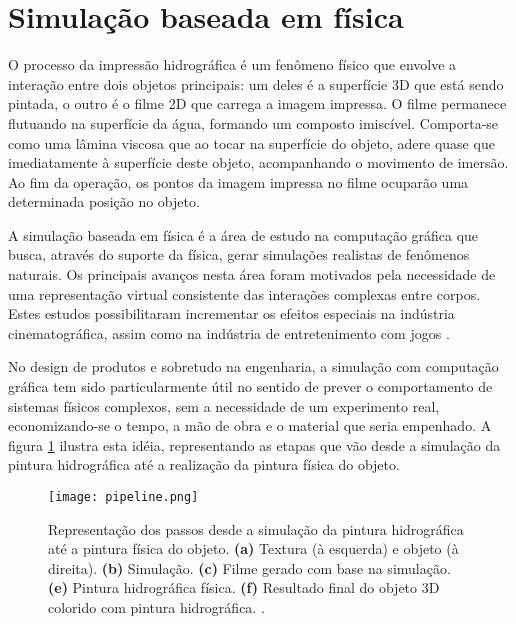 
\acresetall 

\section{Simulação baseada em física}

O processo da impressão hidrográfica é um fenômeno físico que envolve a interação entre dois objetos principais: um deles é a superfície 3D que está sendo pintada, o outro é o filme 2D que carrega a imagem impressa. O filme permanece flutuando na superfície da água, formando um composto imiscível. Comporta-se como uma lâmina viscosa que ao tocar na superfície do objeto, adere quase que imediatamente à superfície deste objeto, acompanhando o movimento de imersão. Ao fim da operação, os pontos da imagem impressa no filme ocuparão uma determinada posição no objeto.

A simulação baseada em física é a área de estudo na computação gráfica que busca, através do suporte da física, gerar simulações realistas de fenômenos naturais. Os principais avanços nesta área foram motivados pela necessidade de uma representação virtual consistente das interações complexas entre corpos. Estes estudos possibilitaram incrementar os efeitos especiais na indústria cinematográfica, assim como na indústria de entretenimento com jogos \cite{reeves1983particle} \cite{millington2007game}.

No design de produtos e sobretudo na engenharia, a simulação com computação gráfica tem sido particularmente útil no sentido de prever o comportamento de sistemas físicos complexos, sem a necessidade de um experimento real, economizando-se o tempo, a mão de obra e o material que seria empenhado. A figura \ref{fig:pipeline1} ilustra esta idéia, representando as etapas que vão desde a simulação da pintura hidrográfica até a realização da pintura física do objeto.

\begin{figure}
\begin{center} 
\texttt{[image: pipeline.png]}
\caption{Representação dos passos desde a simulação da pintura hidrográfica até a pintura física do objeto. \textbf{(a)} Textura (à esquerda) e objeto (à direita). \textbf{(b)} Simulação. \textbf{(c)} Filme gerado com base na simulação. \textbf{(e)} Pintura hidrográfica física. \textbf{(f)} Resultado final do objeto 3D colorido com pintura hidrográfica. \cite{zhang2015}.}
\label{fig:pipeline1}
\end{center} 
\end{figure}

